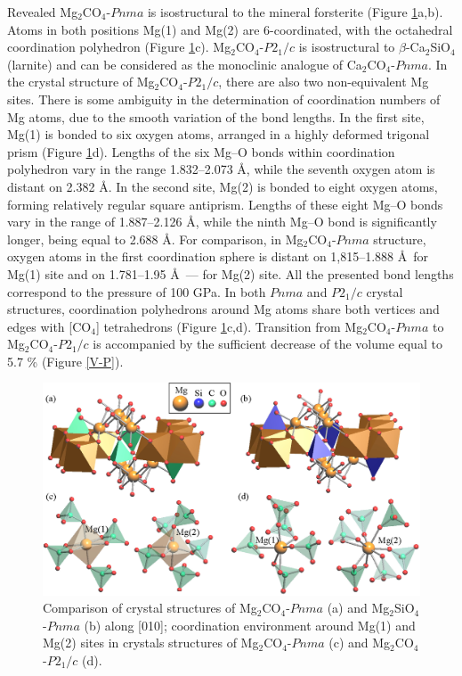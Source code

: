\documentclass[a4paperm]{article}
\begin{document}
Revealed Mg$_2$CO$_4$-$Pnma$ is isostructural to the mineral forsterite (Figure \ref{str}a,b).
Atoms in both positions Mg(1) and Mg(2) are 6-coordinated, with the octahedral coordination polyhedron (Figure \ref{str}c). 
Mg$_2$CO$_4$-$P2_1/c$ is isostructural to $\beta$-Ca$_2$SiO$_4$ (larnite) and can be considered as the monoclinic analogue of Ca$_2$CO$_4$-$Pnma$.
In the crystal structure of Mg$_2$CO$_4$-$P2_1/c$, there are also two non-equivalent Mg sites.
There is some ambiguity in the determination of coordination numbers of Mg atoms, due to the smooth variation of the bond lengths.
In the first site, Mg(1) is bonded to six oxygen atoms, arranged in a highly deformed trigonal prism  (Figure \ref{str}d).
Lengths of the six Mg--O bonds within coordination polyhedron vary in the range 1.832--2.073 \AA, while the seventh oxygen atom is distant on 2.382 \AA.
In the second site, Mg(2) is bonded to eight oxygen atoms, forming relatively regular square antiprism.
Lengths of these eight Mg--O bonds vary in the range of 1.887--2.126 \AA, while the ninth Mg--O bond is significantly longer, being equal to 2.688 \AA.
For comparison, in Mg$_2$CO$_4$-$Pnma$ structure, oxygen atoms in the first coordination sphere is distant on 1,815--1.888 \AA\ for Mg(1) site and on 1.781--1.95 \AA\ --- for Mg(2) site.
All the presented bond lengths correspond to the pressure of 100 GPa.
In both $Pnma$ and $P2_1/c$ crystal structures, coordination polyhedrons around Mg atoms share both vertices and edges with [CO$_4$] tetrahedrons (Figure \ref{str}c,d).
Transition from Mg$_2$CO$_4$-$Pnma$ to Mg$_2$CO$_4$-$P2_1/c$ is accompanied by the sufficient decrease of the volume equal to 5.7 \% (Figure \ref{V-P}).

\begin{figure}[H]
	\includegraphics[width=\textwidth]{mg2co4_str} \centering
	\caption{Comparison of crystal structures of Mg$_2$CO$_4$-$Pnma$ (a) and Mg$_2$SiO$_4$-$Pnma$ (b) along [010]; coordination environment around Mg(1) and Mg(2) sites in crystals structures of Mg$_2$CO$_4$-$Pnma$ (c) and Mg$_2$CO$_4$-$P2_1/c$ (d).} 	\label{str}
\end{figure}
\end{document}
